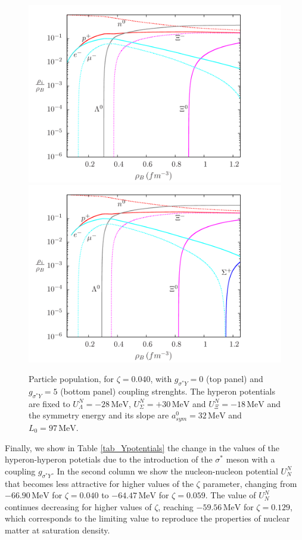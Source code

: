 \documentclass[twocolumn,showpacs,aps]{revtex4}
\begin{document}
\begin{figure}
\centering
 \includegraphics[width=9.cm]{pop_paper_l0040_L97a32.png}
      \centering
 \includegraphics[width=9.cm]{pop_paper_l0040_L97a32_gss5.png}
      \caption{Particle population, for $\zeta=0.040$, with $g_{\sigma^* Y}=0$ (top panel) and $g_{\sigma^* Y}=5$ (bottom panel) 
      coupling strenghts. The hyperon potentials are fixed to $U_{\Lambda}^N=-28\, \mathrm{MeV}$, $U_{\Sigma}^N=+30\, \mathrm{MeV}$
  and $U_{\Xi}^N=-18\, \mathrm{MeV}$ and the symmetry energy and its slope are $a^0_{sym}=32\,\mathrm{MeV}$ and $L_0=97\,\mathrm{MeV}$. } \label{pop_gss}
\end{figure}


Finally, we show in Table \ref{tab_Ypotentials} the change in the values of the hyperon-hyperon potetials due to the 
introduction of the $\sigma^*$ meson with a coupling $g_{\sigma^* Y}$.
In the second column we show the nucleon-nucleon potential $U^N_N$ that becomes less attractive for higher values of the $\zeta$ parameter,
changing from $-66.90\, \mathrm{MeV}$
  for $\zeta=0.040$ to $-64.47\, \mathrm{MeV}$
  for $\zeta=0.059$. 
The value of $U_N^N$ continues decreasing for higher values of $\zeta$, reaching $-59.56\, \mathrm{MeV}$
  for $\zeta=0.129$, 
which corresponds to the limiting value to reproduce the properties of nuclear matter at saturation density. 
\end{document}
